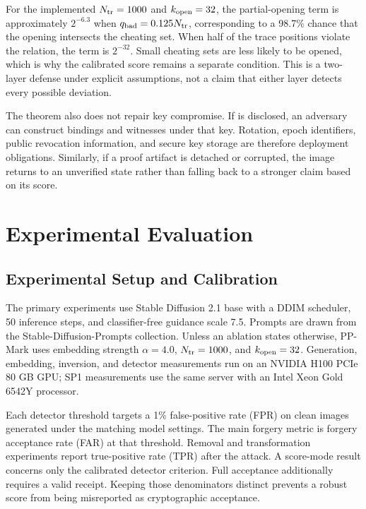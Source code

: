For the implemented \(N_{\mathrm{tr}}=1000\) and
\(k_{\mathrm{open}}=32\), the partial-opening term is approximately
\(2^{-6.3}\) when \(q_{\mathrm{bad}}=0.125N_{\mathrm{tr}}\), corresponding to a
98.7\% chance that the opening intersects the cheating set.  When half of the
trace positions violate the relation, the term is \(2^{-32}\).  Small cheating
sets are less likely to be opened, which is why the calibrated score remains a
separate condition.  This is a two-layer defense under explicit assumptions, not
a claim that either layer detects every possible deviation.

The theorem also does not repair key compromise.  If \PPSecretKey{} is disclosed,
an adversary can construct bindings and witnesses under that key.  Rotation,
epoch identifiers, public revocation information, and secure key storage are
therefore deployment obligations.  Similarly, if a proof artifact is detached or
corrupted, the image returns to an unverified state rather than falling back to a
stronger claim based on its score.

\section{Experimental Evaluation}
\label{sec:ch4-evaluation}

\subsection{Experimental Setup and Calibration}
\label{subsec:ch4-experimental-setup}

The primary experiments use Stable Diffusion 2.1 base with a DDIM scheduler, 50
inference steps, and classifier-free guidance scale 7.5.  Prompts are drawn from
the Stable-Diffusion-Prompts collection.  Unless an ablation states otherwise,
PP-Mark uses embedding strength \(\alpha=4.0\),
\(N_{\mathrm{tr}}=1000\), and \(k_{\mathrm{open}}=32\).  Generation, embedding,
inversion, and detector measurements run on an NVIDIA H100 PCIe 80 GB GPU; SP1
measurements use the same server with an Intel Xeon Gold 6542Y processor.

Each detector threshold targets a 1\% false-positive rate (FPR) on clean images
generated under the matching model settings.  The main forgery metric is forgery
acceptance rate (FAR) at that threshold.  Removal and transformation experiments
report true-positive rate (TPR) after the attack.  A score-mode result concerns
only the calibrated detector criterion.  Full acceptance additionally requires a
valid receipt.  Keeping those denominators distinct prevents a robust score from
being misreported as cryptographic acceptance.


